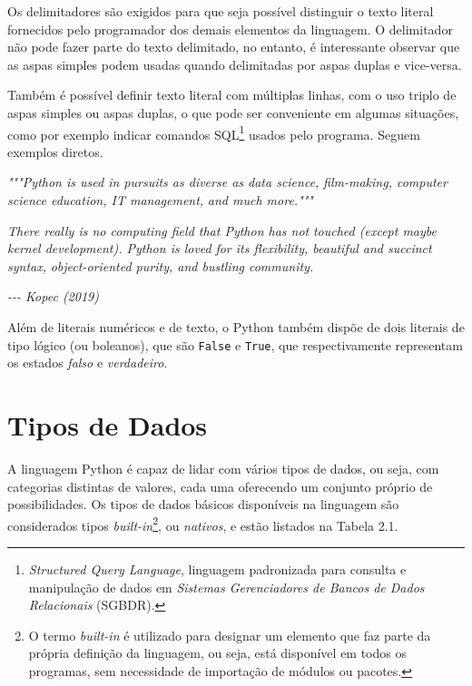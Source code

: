 \documentclass[
]{book}
\newenvironment{Shaded}{\begin{snugshade}}{\end{snugshade}}
\newcommand{\CommentTok}[1]{\textcolor[rgb]{0.56,0.35,0.01}{\textit{#1}}}
\begin{document}
Os delimitadores são exigidos para que seja possível distinguir o texto literal fornecidos pelo programador dos demais elementos da linguagem. O delimitador não pode fazer parte do texto delimitado, no entanto, é interessante observar que as aspas simples podem usadas quando delimitadas por aspas duplas e vice-versa.

Também é possível definir texto literal com múltiplas linhas, com o uso triplo de aspas simples ou aspas duplas, o que pode ser conveniente em algumas situações, como por exemplo indicar comandos SQL\footnote{\emph{Structured Query Language}, linguagem padronizada para consulta e manipulação de dados em \emph{Sistemas Gerenciadores de Bancos de Dados Relacionais} (SGBDR).} usados pelo programa. Seguem exemplos diretos.

\begin{Shaded}
\begin{Highlighting}[]
\CommentTok{"""Python is used in pursuits as diverse as data science,}
\CommentTok{film{-}making, computer science education, IT management, }
\CommentTok{and much more."""}

\CommentTok{\textquotesingle{}\textquotesingle{}\textquotesingle{}There really is no computing field that Python has not }
\CommentTok{touched (except maybe kernel development). Python is loved}
\CommentTok{for its flexibility, beautiful and succinct syntax, }
\CommentTok{object{-}oriented purity, and bustling community.}

\CommentTok{{-}{-}{-} Kopec (2019)\textquotesingle{}\textquotesingle{}\textquotesingle{}}
\end{Highlighting}
\end{Shaded}

Além de literais numéricos e de texto, o Python também dispõe de dois literais de tipo lógico (ou boleanos), que são \texttt{False} e \texttt{True}, que respectivamente representam os estados \emph{falso} e \emph{verdadeiro}.

\hypertarget{comput-tipos}{%
\section{Tipos de Dados}\label{comput-tipos}}

A linguagem Python é capaz de lidar com vários tipos de dados, ou seja, com categorias distintas de valores, cada uma oferecendo um conjunto próprio de possibilidades. Os tipos de dados básicos disponíveis na linguagem são considerados tipos \emph{built-in}\footnote{O termo \emph{built-in} é utilizado para designar um elemento que faz parte da própria definição da linguagem, ou seja, está disponível em todos os programas, sem necessidade de importação de módulos ou pacotes.}, ou \emph{nativos}, e estão listados na Tabela 2.1.
\end{document}
